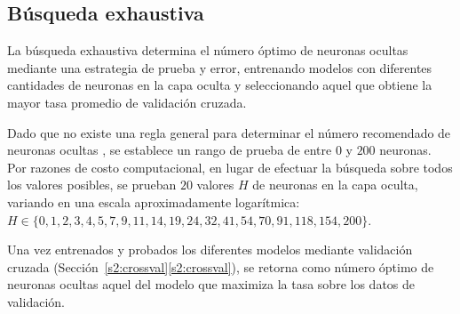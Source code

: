 %
\subsection{Búsqueda exhaustiva}
%
La búsqueda exhaustiva determina el número óptimo de neuronas ocultas
mediante una estrategia de prueba y error, entrenando modelos con
diferentes cantidades de neuronas en la capa oculta y seleccionando
aquel que obtiene la mayor tasa \GM{} promedio de validación cruzada.

Dado que no existe una regla general para determinar el número
recomendado de neuronas ocultas \cite{nnfaq3}, se establece un rango
de prueba de entre $0$ y $200$ neuronas.
Por razones de costo computacional, en lugar de efectuar la búsqueda
sobre todos los valores posibles, se prueban $20$ valores $H$ de
neuronas en la capa oculta, variando en una escala aproximadamente
logarítmica: $H\in\{0,1,2,3,4,5,7,9,11,14,19,24,32,41,54,70,91,118,154,200\}$.

Una vez entrenados y probados los diferentes modelos mediante validación
cruzada (\iflatexml{}Sección~\ref{s2:crossval}\else\autoref{s2:crossval}\fi{}),
se retorna como número óptimo de neuronas ocultas aquel del modelo que
maximiza la tasa \GM{} sobre los datos de validación.
